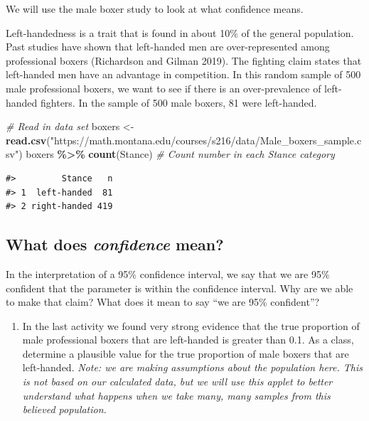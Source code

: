 \documentclass[
]{report}
\newenvironment{Shaded}{\begin{snugshade}}{\end{snugshade}}
\newcommand{\CommentTok}[1]{\textcolor[rgb]{0.56,0.35,0.01}{\textit{#1}}}
\newcommand{\FunctionTok}[1]{\textcolor[rgb]{0.13,0.29,0.53}{\textbf{#1}}}
\newcommand{\NormalTok}[1]{#1}
\newcommand{\OtherTok}[1]{\textcolor[rgb]{0.56,0.35,0.01}{#1}}
\newcommand{\SpecialCharTok}[1]{\textcolor[rgb]{0.81,0.36,0.00}{\textbf{#1}}}
\newcommand{\StringTok}[1]{\textcolor[rgb]{0.31,0.60,0.02}{#1}}
\providecommand{\tightlist}{%
  \setlength{\itemsep}{0pt}\setlength{\parskip}{0pt}}
\begin{document}
We will use the male boxer study to look at what confidence means.

Left-handedness is a trait that is found in about 10\% of the general population. Past studies have shown that left-handed men are over-represented among professional boxers (Richardson and Gilman 2019). The fighting claim states that left-handed men have an advantage in competition. In this random sample of 500 male professional boxers, we want to see if there is an over-prevalence of left-handed fighters. In the sample of 500 male boxers, 81 were left-handed.

\begin{Shaded}
\begin{Highlighting}[]
 \CommentTok{\# Read in data set}
\NormalTok{boxers }\OtherTok{\textless{}{-}} \FunctionTok{read.csv}\NormalTok{(}\StringTok{"https://math.montana.edu/courses/s216/data/Male\_boxers\_sample.csv"}\NormalTok{)}
\NormalTok{boxers }\SpecialCharTok{\%\textgreater{}\%} \FunctionTok{count}\NormalTok{(Stance)  }\CommentTok{\# Count number in each Stance category}
\end{Highlighting}
\end{Shaded}

\begin{verbatim}
#>         Stance   n
#> 1  left-handed  81
#> 2 right-handed 419
\end{verbatim}

\subsection*{\texorpdfstring{What does \emph{confidence} mean?}{What does confidence mean?}}\label{what-does-confidence-mean}

In the interpretation of a 95\% confidence interval, we say that we are 95\% confident that the parameter is within the confidence interval. Why are we able to make that claim? What does it mean to say ``we are 95\% confident''?

\begin{enumerate}
\def\labelenumi{\arabic{enumi}.}
\tightlist
\item
  In the last activity we found very strong evidence that the true proportion of male professional boxers that are left-handed is greater than 0.1. As a class, determine a plausible value for the true proportion of male boxers that are left-handed. \emph{Note: we are making assumptions about the population here. This is not based on our calculated data, but we will use this applet to better understand what happens when we take many, many samples from this believed population.}
\end{enumerate}
\end{document}
